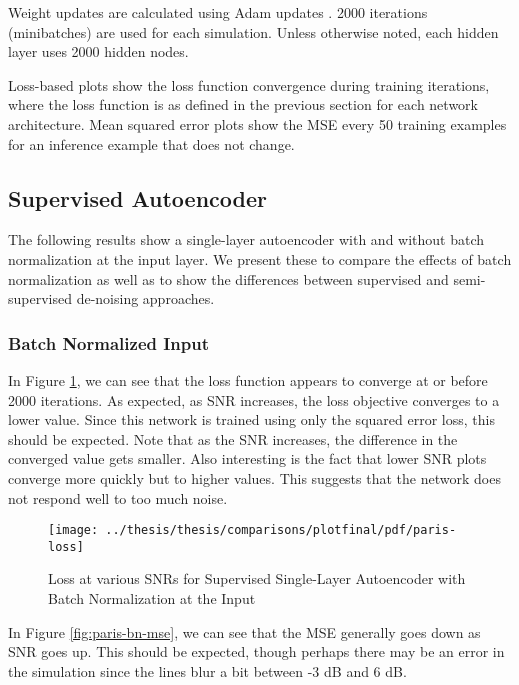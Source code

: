 Weight updates are calculated using Adam updates \cite{DBLP:journals/corr/KingmaB14}. 2000 iterations (minibatches) are used for each simulation. Unless otherwise noted, each hidden layer uses 2000 hidden nodes.

Loss-based plots show the loss function convergence during training iterations, where the loss function is as defined in the previous section for each network architecture. Mean squared error plots show the MSE every 50 training examples for an inference example that does not change.

\subsection{Supervised Autoencoder}

The following results show a single-layer autoencoder with and without batch normalization at the input layer. We present these to compare the effects of batch normalization as well as to show the differences between supervised and semi-supervised de-noising approaches.

\subsubsection{Batch Normalized Input}

In Figure \ref{fig:paris-bn-loss}, we can see that the loss function appears to converge at or before 2000 iterations. As expected, as SNR increases, the loss objective converges to a lower value. Since this network is trained using only the squared error loss, this should be expected. Note that as the SNR increases, the difference in the converged value gets smaller. Also interesting is the fact that lower SNR plots converge more quickly but to higher values. This suggests that the network does not respond well to too much noise.

\begin{figure}[!ht]
\centering
\texttt{[image: ../thesis/thesis/comparisons/plotfinal/pdf/paris-loss]}
\caption{Loss at various SNRs for Supervised Single-Layer Autoencoder with Batch Normalization at the Input}\label{fig:paris-bn-loss}
\end{figure}

In Figure \ref{fig:paris-bn-mse}, we can see that the MSE generally goes down as SNR goes up. This should be expected, though perhaps there may be an error in the simulation since the lines blur a bit between -3 dB and 6 dB.

